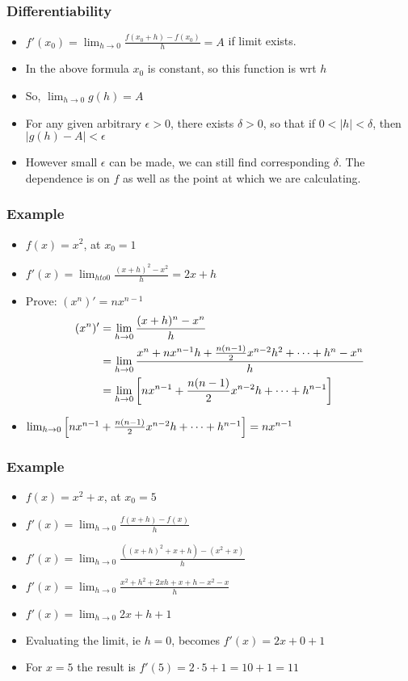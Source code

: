 \begin{frame}[fragile]\frametitle{Differentiability}
\begin{itemize}
\item $f'(x_0) = \lim_{h \to 0} \frac{f(x_0 + h) - f(x_0)}{h} = A$ if limit exists.
\item In the above formula $x_0$ is constant, so this function is wrt $h$
\item So, $\lim_{h \to 0} g(h) = A$
\item For any given arbitrary $\epsilon > 0 $, there exists $\delta > 0$, so that if $0 < | h| < \delta$, then $|g(h) - A| < \epsilon$
\item However small $\epsilon$ can be made, we can still find corresponding $\delta$. The dependence is on $f$ as well as the point at which we are calculating.
\end{itemize}
\end{frame}

 \begin{frame}[fragile]\frametitle{Example}
\begin{itemize}
\item $f(x) = x^2$, at $x_0 = 1$
\item $f'(x) = \lim_{h to 0} \frac{(x+h)^2 - x^2}{h} = 2x + h$
\item Prove: $(x^n)' = n x^{n-1}$
\begin{align}
(x^n)'&=\lim_{h \to 0} {(x+h)^n-x^n\over h}\\
&=\lim_{h \to 0} {x^n+nx^{n-1}h+{n(n-1)\over 2}x^{n-2}h^2+\cdots+h^n-x^n\over h} \\
&=\lim_{h \to 0} \left[ nx^{n-1}+{n(n-1)\over 2}x^{n-2}h+\cdots+h^{n-1} \right]
\end{align}
\item $\lim_{h \to 0} \left[ nx^{n-1}+{n(n-1)\over 2}x^{n-2}h+\dots+h^{n-1} \right]= nx^{n-1}$
\end{itemize}
\end{frame}

 \begin{frame}[fragile]\frametitle{Example}
\begin{itemize}
\item $f(x) = x^2 + x $, at $x_0 = 5$
\item $f'(x) = \lim_{h \to 0} \frac{f(x + h) - f(x)}{h}$
\item $f'(x) = \lim_{h \to 0} \frac{((x+h)^{2} + x + h) - (x^{2} + x)}{h}$
\item $f'(x) = \lim_{h \to 0} \frac{x^{2} + h^{2} + 2xh + x + h - x^{2} - x}{h}$
\item $f'(x) = \lim_{h \to 0} 2x + h + 1 $
\item Evaluating the limit, ie $h=0$, becomes $f'(x) = 2x + 0 + 1$
\item For $x = 5 $ the result is $f'(5) = 2\cdot5 + 1 = 10 + 1 = 11$
\end{itemize}
\end{frame}

